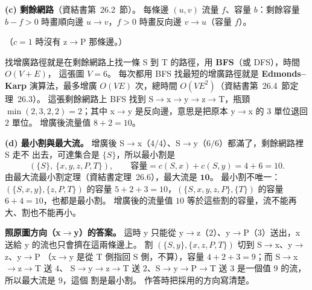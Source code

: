 \begin{pastsoln}
\textbf{(c) 剩餘網路}（資結書第~26.2~節）。 每條邊 $(u, v)$ 流量 $f$、容量 $b$：剩餘容量
$b - f > 0$ 時畫順向邊 $u \to v$，$f > 0$ 時畫反向邊 $v \to u$（容量 $f$）。
\begin{center}
\end{center}
（$c = 1$ 時沒有 z$\to$P 那條邊。）

找增廣路徑就是在剩餘網路上找一條 S 到 T 的路徑，用 \textbf{BFS}（或 DFS），時間 $O(V + E)$，
這張圖 $V = 6$。 每次都用 BFS 找最短的增廣路徑就是 \textbf{Edmonds--Karp} 演算法，最多增廣
$O(VE)$ 次，總時間 $O(VE^2)$（資結書第~26.4~節定理~26.3）。 這張剩餘網路上 BFS 找到
S$\to$x$\to$y$\to$z$\to$T，瓶頸 $\min(2, 3, 2, 2) = 2$；其中 x$\to$y 是反向邊，意思是把原本
y$\to$x 的 $3$ 單位退回 $2$ 單位。 增廣後流量值 $8 + 2 = 10$。

\textbf{(d) 最小割與最大流。} 增廣後 S$\to$x（$4/4$）、S$\to$y（$6/6$）都滿了，剩餘網路裡 S 走不
出去，可達集合是 $\{S\}$，所以最小割是
\[
(\{S\},\ \{x, y, z, P, T\}),\qquad \text{容量} = c(S, x) + c(S, y) = 4 + 6 = 10.
\]
由最大流最小割定理（資結書定理~26.6），最大流是 $\mathbf{10}$。 最小割不唯一：
$(\{S, x, y\}, \{z, P, T\})$ 的容量 $5 + 2 + 3 = 10$，$(\{S, x, y, z, P\}, \{T\})$ 的容量
$6 + 4 = 10$，也都是最小割。 增廣後的流量值 $10$ 等於這些割的容量，流不能再大、割也不能再小。

\textbf{照原圖方向（x$\to$y）的答案。} 這時 y 只能從 y$\to$z（$2$）、y$\to$P（$3$）送出，x 送給 y
的流也只會擠在這兩條邊上。 割 $(\{S, y\}, \{x, z, P, T\})$ 切到 S$\to$x、y$\to$z、y$\to$P
（x$\to$y 是從 T 側指回 S 側，不算），容量 $4 + 2 + 3 = 9$；而 S$\to$x$\to$z$\to$T 送 $4$、
S$\to$y$\to$z$\to$T 送 $2$、S$\to$y$\to$P$\to$T 送 $3$ 是一個值 $9$ 的流，所以最大流是 $9$，這個
割是最小割。 作答時把採用的方向寫清楚。
\end{pastsoln}
